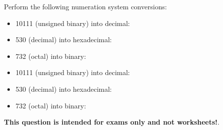 

Perform the following numeration system conversions:

\begin{itemize}
\item{} 10111 (unsigned binary) into decimal: \underbar{\hskip 50pt}
\vskip 10pt
\item{} 530 (decimal) into hexadecimal: \underbar{\hskip 50pt}
\vskip 10pt
\item{} 732 (octal) into binary: \underbar{\hskip 50pt}
\end{itemize}







\begin{itemize}
\item{} 10111 (unsigned binary) into decimal: 
\vskip 10pt
\item{} 530 (decimal) into hexadecimal: 
\vskip 10pt
\item{} 732 (octal) into binary: 
\end{itemize}







{\bf This question is intended for exams only and not worksheets!}.




